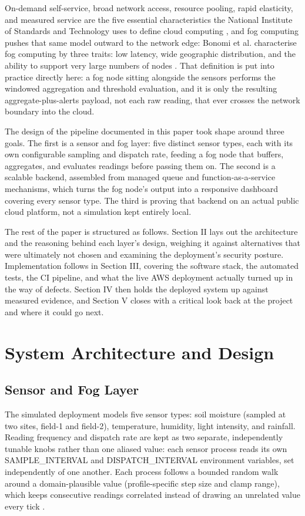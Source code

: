 \documentclass[conference]{IEEEtran}
\begin{document}
On-demand self-service, broad network access, resource pooling, rapid elasticity, and measured service are the five essential characteristics the National Institute of Standards and Technology uses to define cloud computing \cite{ref2}, and fog computing pushes that same model outward to the network edge: Bonomi et al. characterise fog computing by three traits: low latency, wide geographic distribution, and the ability to support very large numbers of nodes \cite{ref3}. That definition is put into practice directly here: a fog node sitting alongside the sensors performs the windowed aggregation and threshold evaluation, and it is only the resulting aggregate-plus-alerts payload, not each raw reading, that ever crosses the network boundary into the cloud.

The design of the pipeline documented in this paper took shape around three goals. The first is a sensor and fog layer: five distinct sensor types, each with its own configurable sampling and dispatch rate, feeding a fog node that buffers, aggregates, and evaluates readings before passing them on. The second is a scalable backend, assembled from managed queue and function-as-a-service mechanisms, which turns the fog node's output into a responsive dashboard covering every sensor type. The third is proving that backend on an actual public cloud platform, not a simulation kept entirely local.

The rest of the paper is structured as follows. Section II lays out the architecture and the reasoning behind each layer's design, weighing it against alternatives that were ultimately not chosen and examining the deployment's security posture. Implementation follows in Section III, covering the software stack, the automated tests, the CI pipeline, and what the live AWS deployment actually turned up in the way of defects. Section IV then holds the deployed system up against measured evidence, and Section V closes with a critical look back at the project and where it could go next.

\section{System Architecture and Design}

\subsection{Sensor and Fog Layer}
The simulated deployment models five sensor types: soil moisture (sampled at two sites, field-1 and field-2), temperature, humidity, light intensity, and rainfall. Reading frequency and dispatch rate are kept as two separate, independently tunable knobs rather than one aliased value: each sensor process reads its own SAMPLE\_INTERVAL and DISPATCH\_INTERVAL environment variables, set independently of one another. Each process follows a bounded random walk around a domain-plausible value (profile-specific step size and clamp range), which keeps consecutive readings correlated instead of drawing an unrelated value every tick \cite{ref4}.
\end{document}
